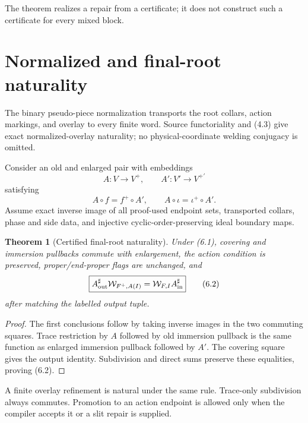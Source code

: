 \documentclass[11pt]{article}
\newtheorem{theorem}{Theorem}[section]
\theoremstyle{definition}
\theoremstyle{remark}
\begin{document}
The theorem realizes a repair from a certificate; it does not construct such a
certificate for every mixed block.

\section{Normalized and final-root naturality}
The binary pseudo-piece normalization transports the root collars, action
markings, and overlay to every finite word.  Source functoriality and (4.3) give
exact normalized-overlay naturality; no physical-coordinate welding conjugacy
is omitted.

Consider an old and enlarged pair with embeddings
\[
 A:V\to V^+,
 \qquad A':V'\to V^{+'}
\]
satisfying
\[
 \boxed{A\circ f=f^+\circ A',\qquad
 A\circ\iota=\iota^+\circ A'.}
 \tag{6.1}
\]
Assume exact inverse image of all proof-used endpoint sets, transported collars,
phase and side data, and injective cyclic-order-preserving ideal boundary maps.

\begin{theorem}[Certified final-root naturality]
Under (6.1), covering and immersion pullbacks commute with enlargement, the
action condition is preserved, proper/end-proper flags are unchanged, and
\[
 \boxed{
 A_{\rm out}^{\sharp}\mathcal W_{F^+,A(I)}
 =\mathcal W_{F,I}A_{\rm in}^{\sharp}
 }
 \tag{6.2}
\]
after matching the labelled output tuple.
\end{theorem}

\begin{proof}
The first conclusions follow by taking inverse images in the two commuting
squares.  Trace restriction by $A$ followed by old immersion pullback is the
same function as enlarged immersion pullback followed by $A'$.  The covering
square gives the output identity.  Subdivision and direct sums preserve these
equalities, proving (6.2).
\end{proof}

A finite overlay refinement is natural under the same rule.  Trace-only
subdivision always commutes.  Promotion to an action endpoint is allowed only
when the compiler accepts it or a slit repair is supplied.
\end{document}
